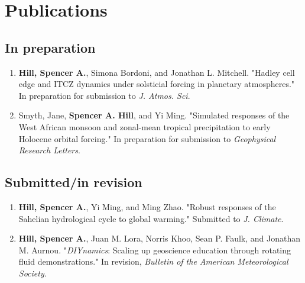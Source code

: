 \documentclass[12pt,letterpaper]{shillcv}
\begin{document}
\section*{Publications}
\label{sec:orgd97c41b}
\subsection*{In preparation}
\label{sec:orgdc2610c}
\begin{enumerate}
\item \textbf{Hill, Spencer A.}, Simona Bordoni, and Jonathan L. Mitchell.  "Hadley cell
edge and ITCZ dynamics under solsticial forcing in planetary atmospheres."
In preparation for submission to \emph{J. Atmos. Sci}.
\item Smyth, Jane, \textbf{Spencer A. Hill}, and Yi Ming.  "Simulated responses of the
West African monsoon and zonal-mean tropical precipitation to early Holocene
orbital forcing."  In preparation for submission to \emph{Geophysical Research
Letters}.
\end{enumerate}
\subsection*{Submitted/in revision}
\label{sec:org6454758}
\begin{enumerate}
\item \textbf{Hill, Spencer A.}, Yi Ming, and Ming Zhao.  "Robust responses of the
Sahelian hydrological cycle to global warming."  Submitted to \emph{J. Climate}.
\item \textbf{Hill, Spencer A.}, Juan M. Lora, Norris Khoo, Sean P. Faulk, and Jonathan M.
Aurnou.  "\emph{DIYnamics}: Scaling up geoscience education through rotating fluid
demonstrations."  In revision, \emph{Bulletin of the American Meteorological
Society}.
\end{enumerate}
\end{document}

